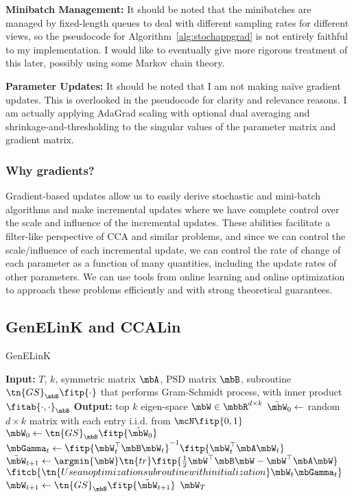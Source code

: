 \documentclass{article}
\begin{document}
	\noindent \textbf{Minibatch Management:} It should be noted that the minibatches are managed by fixed-length queues to deal with different sampling rates for different views, so the pseudocode for Algorithm~\ref{alg:stochappgrad} is not entirely faithful to my implementation. I would like to eventually give more rigorous treatment of this later, possibly using some Markov chain theory.
	
	\noindent \textbf{Parameter Updates:} It should be noted that I am not making na\"{i}ve gradient updates. This is overlooked in the pseudocode for clarity and relevance reasons. I am actually applying AdaGrad scaling with optional dual averaging and shrinkage-and-thresholding to the singular values of the parameter matrix and gradient matrix.
	
	\subsubsection{Why gradients?} \label{subsubsec:whygradients}
	Gradient-based updates allow us to easily derive stochastic and mini-batch algorithms and make incremental updates where we have complete control over the scale and influence of the incremental updates. These abilities facilitate a filter-like perspective of CCA and similar problems, and since we can control the scale/influence of each incremental update, we can control the rate of change of each parameter as a function of many quantities, including the update rates of other parameters. We can use tools from online learning and online optimization to approach these problems efficiently and with strong theoretical guarantees.
	
	\subsection{GenELinK and CCALin} \label{subsec:genelinkandccalin}
	
	\begin{algorithm}
	\caption{GenELinK} \label{alg:genelink}
	\begin{algorithmic}[1]
	\STATE \textbf{Input:} $T$, $k$, symmetric matrix $\mbA$, PSD matrix $\mbB$, subroutine $\tn{GS}_{\mbB}\fitp{\cdot}$ that performs Gram-Schmidt process, with inner product $\fitab{\cdot,\cdot}_{\mbB}$
	\STATE \textbf{Output:} top $k$ eigen-space $\mbW \in \mbbR^{d \times k}$
	\STATE $\tilde{\mbW}_0 \leftarrow$ random $d \times k$ matrix with each entry i.i.d. from $\mcN \fitp{0,1}$
	\STATE $\mbW_0 \leftarrow \tn{GS}_{\mbB}\fitp{\tilde{\mbW}_0}$
	\STATE $\mbGamma_t \leftarrow \fitp{\mbW_t^{\top}\mbB\mbW_t}^{-1}\fitp{\mbW_t^{\top}\mbA\mbW_t}$
	\STATE $\tilde{\mbW}_{t+1} \leftarrow \argmin{\mbW} \tn{tr}\fitp{\frac{1}{2}\mbW^{\top}\mbB\mbW - \mbW^{\top}\mbA\mbW}$
	\STATE $\fitcb{\tn{Use an optimization subroutine with initialization } \mbW_t\mbGamma_t}$
	\STATE $\mbW_{t+1} \leftarrow \tn{GS}_{\mbB}\fitp{\tilde{\mbW}_{t+1}}$
	\ENDFOR
	\RETURN $\mbW_T$
	\end{algorithmic}
	\end{algorithm}
	
\end{document}

